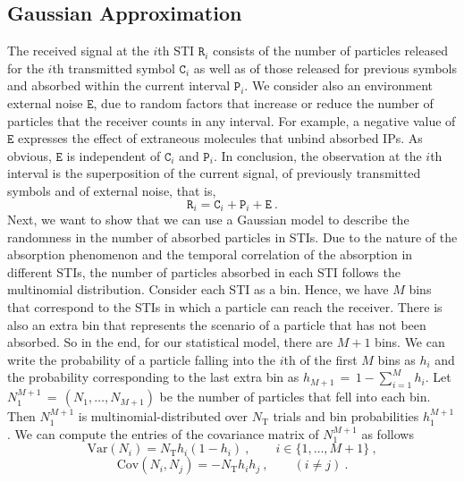 \documentclass[journal]{IEEEtranTCOM}
\begin{document}
\subsection{Gaussian Approximation}
\par The received signal at the $i$th STI $\mathtt{R}_{i}$ consists of the number of particles released for the $i$th transmitted symbol $\mathtt{C}_{i}$ as well as of those released for previous symbols and absorbed within the current interval $\mathtt{P}_{i}$. We consider also an environment external noise $\mathtt{E}$, due to random factors that increase or reduce the number of particles that the receiver counts in any interval. For example, a negative value of $\mathtt{E}$ expresses the effect of extraneous molecules that unbind absorbed IPs. As obvious, $\mathtt{E}$ is independent of $\mathtt{C}_{i}$ and $\mathtt{P}_{i}$. In conclusion, the observation at the $i$th interval is the superposition of the current signal, of previously transmitted symbols and of external noise, that is,
\begin{equation}
    \mathtt{R}_{i} = \mathtt{C}_{i} + \mathtt{P}_{i} + \mathtt{E}~.
    \label{eq:N_r}
\end{equation}
Next, we want to show that we can use a Gaussian model to describe the randomness in the number of absorbed particles in STIs. Due to the nature of the absorption phenomenon and the temporal correlation of the absorption in different STIs, the number of particles absorbed in each STI follows the multinomial distribution. Consider each STI as a bin. Hence, we have $M$ bins that correspond to the STIs in which a particle can reach the receiver. There is also an extra bin that represents the scenario of a particle that has not been absorbed. So in the end, for our statistical model, there are $M+1$ bins. We can write the probability of a particle falling into the $i$th of the first $M$ bins as $h_{i}$ and the probability corresponding to the last extra bin as $h_{M+1}$$\,=\,$$1-\sum_{i=1}^{M} h_{i}$. Let $N_{1}^{M+1}$$\,=\,$$(N_1, \ldots, N_{M+1})$ be the number of particles that fell into each bin. Then $N_{1}^{M+1}$ is multinomial-distributed over $N_{\mathrm{T}}$ trials and bin probabilities $h_{1}^{M+1}$. We can compute the entries of the  covariance matrix of $N_{1}^{M+1}$ as follows 
\begin{equation}
    \mathrm{Var}(N_i) = N_{\mathrm{T}}h_{i}(1-h_{i})~,\qquad i\in\{1,\ldots,M+1\}~,
\end{equation}
\begin{equation}
    \mathrm{Cov}(N_i,N_j) = -N_{\mathrm{T}}h_{i}h_{j}~,\qquad (i\neq j)~.
\end{equation}
\end{document}
